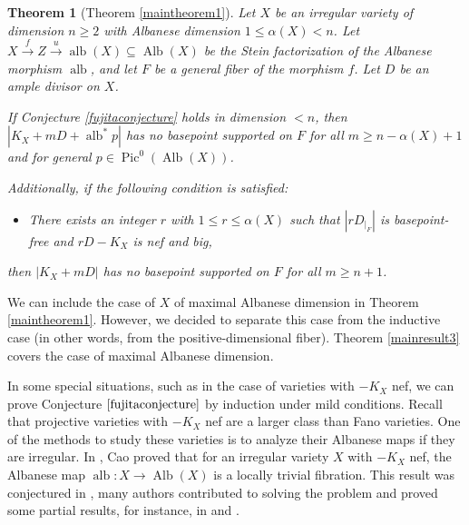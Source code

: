 \documentclass[sn-mathphys-num]{sn-jnl}%
\newtheorem*{theorem*}{Theorem}
\theoremstyle{definition}
\numberwithin{equation}{section}
\begin{document}
\begin{theorem*}[Theorem \ref{maintheorem1}]
Let $X$ be an irregular variety of dimension $n\geq 2$ with Albanese dimension $1 \leq \alpha(X)<n$. Let $X \xrightarrow{f} Z \xrightarrow{u} \operatorname{alb}(X) \subseteq \operatorname{Alb}(X)$ be the Stein factorization of the Albanese morphism $\operatorname{alb}$, and let $F$ be a general fiber of the morphism $f$. Let $D$ be an ample divisor on $X$.
\par If  Conjecture \ref{fujitaconjecture} holds in dimension $<n$, then $|K_{X} + mD + \operatorname{alb}^{*}p|$ has no  basepoint supported on $F$ for all $m \geq n-\alpha(X)+1$ and for general $p \in \operatorname{Pic}^{0}(\operatorname{Alb}(X))$.
\par Additionally, if the following condition is satisfied:
\begin{itemize}
    \item[$(*)$]There exists an integer $r$ with $1\leq r \leq \alpha(X)$ such that $|rD_{|_{F}}|$ is basepoint-free and $rD - K_{X}$ is nef and big,
\end{itemize}
then $|K_{X} + mD|$ has no  basepoint supported on $F$ for all $m \geq n+1$.
\end{theorem*}
\par We can include the case of $X$ of maximal Albanese dimension in Theorem \ref{maintheorem1}. However, we decided to separate this case from the inductive case
(in other words, from the positive-dimensional fiber). Theorem \ref{mainresult3} covers the case of maximal Albanese dimension.
\par In some special situations, such as in the case of varieties with $-K_{X}$ nef, we can prove Conjecture $\ref{fujitaconjecture}$ by induction under mild conditions. Recall that projective varieties with $-K_{X}$ nef are a larger class than Fano varieties. One of the methods to study these varieties is to analyze their Albanese maps if they are irregular. In \cite[Theorem 1.2]{Cao}, Cao proved that for an irregular variety $X$ with $-K_{X}$ nef, the Albanese map $\operatorname{alb}: X \to \operatorname{Alb}(X)$ is a locally trivial fibration. This result was conjectured in \cite[Page 221]{DPS}, many authors contributed 
to solving the problem and proved some partial results, for instance, in \cite[Page 532]{steven} and \cite[Theorem 1]{qizhang1}. 
\end{document}

